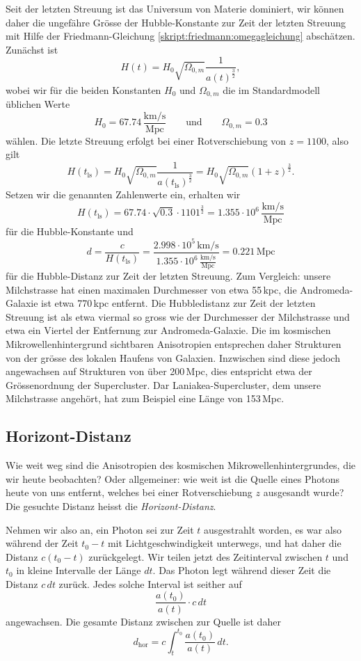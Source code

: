 Seit der letzten Streuung ist das Universum von Materie dominiert,
wir können daher die ungefähre Grösse der Hubble-Konstante zur
Zeit der letzten Streuung mit Hilfe der
Friedmann-Gleichung \eqref{skript:friedmann:omegagleichung}
abschätzen.
Zunächst ist
\[
H(t) = H_0\sqrt{\Omega_{0,m}}\frac{1}{a(t)^\frac32},
\]
wobei wir für die beiden Konstanten $H_0$ und $\Omega_{0,m}$ die
im Standardmodell üblichen Werte
\[
H_0
=
67.74\,\frac{\text{km/s}}{\text{Mpc}}
\qquad\text{und}\qquad
\Omega_{0,m}=0.3
\]
wählen.
Die letzte Streuung erfolgt bei einer Rotverschiebung von $z=1100$, also
gilt
\[
H(t_{\text{ls}})
=
H_0\sqrt{\Omega_{0,m}}\frac{1}{a(t_{\text{ls}})^\frac32}
=
H_0\sqrt{\Omega_{0,m}}(1+z)^\frac32.
\]
Setzen wir die genannten Zahlenwerte ein, erhalten wir
\[
H(t_{\text{ls}})
=
67.74\cdot \sqrt{0.3}\cdot 1101^\frac32
=
1.355\cdot 10^{6}\,\frac{\text{km/s}}{\text{Mpc}}
\]
für die Hubble-Konstante und 
\[
d
=
\frac{c}{H(t_{\text{ls}})}
=
\frac{2.998\cdot 10^{5}\,\text{km/s}}%
{1.355\cdot 10^{6}\,\frac{\text{km/s}}{\text{Mpc}}}
=
0.221\,\text{Mpc}
\]
für die Hubble-Distanz zur Zeit der letzten Streuung.
Zum Vergleich: unsere Milchstrasse hat einen maximalen Durchmesser
von etwa 55\,kpc, die Andromeda-Galaxie ist etwa 770\,kpc entfernt.
%
Die Hubbledistanz zur Zeit der letzten Streuung ist als etwa viermal
so gross wie der Durchmesser der Milchstrasse und etwa ein Viertel der
Entfernung zur Andromeda-Galaxie.
Die im kosmischen Mikrowellenhintergrund sichtbaren Anisotropien
entsprechen daher Strukturen von der grösse des lokalen Haufens von
Galaxien.
%
Inzwischen sind diese jedoch angewachsen auf Strukturen von über 200\,Mpc,
dies entspricht etwa der Grössenordnung der Supercluster.
Dar Laniakea-Supercluster, dem unsere Milchstrasse angehört, hat zum Beispiel
eine Länge von 153\,Mpc.
%

\subsection{Horizont-Distanz}
Wie weit weg sind die Anisotropien des kosmischen Mikrowellenhintergrundes,
die wir heute beobachten?
Oder allgemeiner: wie weit ist die Quelle eines Photons heute von uns
entfernt, welches bei einer Rotverschiebung $z$ ausgesandt wurde?
Die gesuchte Distanz heisst die {\em Horizont-Distanz}.

Nehmen wir also an, ein Photon sei zur Zeit $t$ ausgestrahlt worden,
es war also während der Zeit $t_0-t$ mit Lichtgeschwindigkeit unterwegs,
und hat daher die Distanz $c(t_0-t)$ zurückgelegt.
Wir teilen jetzt des Zeitinterval zwischen $t$ und $t_0$ in kleine
Intervalle der Länge $dt$.
Das Photon legt während dieser Zeit die Distanz $c\,dt$ zurück.
Jedes solche Interval ist seither auf
\[
\frac{a(t_0)}{a(t)}\cdot c \,dt
\]
angewachsen.
Die gesamte Distanz zwischen zur Quelle ist daher
\begin{equation}
d_\text{hor} = c \int_t^{t_0} \frac{a(t_0)}{a(t)}\,dt.
\label{skript:cmb:horizontallg}
\end{equation}

